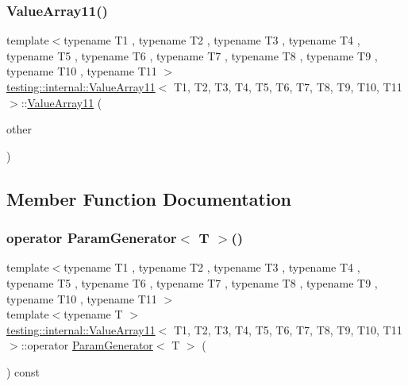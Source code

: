 \subsubsection{\texorpdfstring{ValueArray11()}{ValueArray11()}\hspace{0.1cm}{\footnotesize\ttfamily [2/2]}}
{\footnotesize\ttfamily template$<$typename T1 , typename T2 , typename T3 , typename T4 , typename T5 , typename T6 , typename T7 , typename T8 , typename T9 , typename T10 , typename T11 $>$ \\
\mbox{\hyperlink{classtesting_1_1internal_1_1_value_array11}{testing\+::internal\+::\+Value\+Array11}}$<$ T1, T2, T3, T4, T5, T6, T7, T8, T9, T10, T11 $>$\+::\mbox{\hyperlink{classtesting_1_1internal_1_1_value_array11}{Value\+Array11}} (\begin{DoxyParamCaption}\item[{const \mbox{\hyperlink{classtesting_1_1internal_1_1_value_array11}{Value\+Array11}}$<$ T1, T2, T3, T4, T5, T6, T7, T8, T9, T10, T11 $>$ \&}]{other }\end{DoxyParamCaption})\hspace{0.3cm}{\ttfamily [inline]}}



\subsection{Member Function Documentation}
\mbox{\label{classtesting_1_1internal_1_1_value_array11_a3042498fcde8d1c91df474e618416f28}} 
\subsubsection{\texorpdfstring{operator ParamGenerator$<$ T $>$()}{operator ParamGenerator< T >()}}
{\footnotesize\ttfamily template$<$typename T1 , typename T2 , typename T3 , typename T4 , typename T5 , typename T6 , typename T7 , typename T8 , typename T9 , typename T10 , typename T11 $>$ \\
template$<$typename T $>$ \\
\mbox{\hyperlink{classtesting_1_1internal_1_1_value_array11}{testing\+::internal\+::\+Value\+Array11}}$<$ T1, T2, T3, T4, T5, T6, T7, T8, T9, T10, T11 $>$\+::operator \mbox{\hyperlink{classtesting_1_1internal_1_1_param_generator}{Param\+Generator}}$<$ T $>$ (\begin{DoxyParamCaption}{ }\end{DoxyParamCaption}) const\hspace{0.3cm}{\ttfamily [inline]}}

